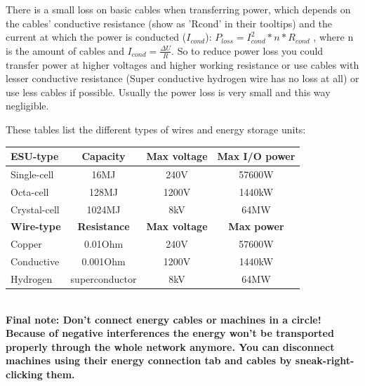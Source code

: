 \documentclass[11pt]{article} %
\begin{document}
There is a small loss on basic cables when transferring power, which depends on the cables' conductive resistance (show as 'Rcond' in their tooltips) and the current at which the power is conducted ($I_{cond}$): ${P_{loss} = I_{cond}^2 * n * R_{cond}}$ , where n is the amount of cables and ${I_{cond} = \frac{\Delta U}{R}}$. So to reduce power loss you could transfer power at higher voltages and higher working resistance or use cables with lesser conductive resistance (Super conductive hydrogen wire has no loss at all) or use less cables if possible. Usually the power loss is very small and this way negligible.

These tables list the different types of wires and energy storage units: \\
\begin{tabular}{| l | c | c | c |} \hline
\bf ESU-type & \bf Capacity & \bf Max voltage & \bf Max I/O power \\ \hline
Single-cell & 16MJ & 240V & 57600W \\
Octa-cell & 128MJ & 1200V & 1440kW \\
Crystal-cell & 1024MJ & 8kV & 64MW \\ \hline
\bf Wire-type & \bf Resistance & \bf Max voltage & \bf Max power \\ \hline
Copper & 0.01Ohm & 240V & 57600W \\
Conductive & 0.001Ohm & 1200V & 1440kW \\
Hydrogen & superconductor & 8kV & 64MW \\ \hline
\end{tabular}\\

\bf Final note: Don't connect energy cables or machines in a circle! Because of negative interferences the energy won't be transported properly through the whole network anymore. \rm You can disconnect machines using their energy connection tab and cables by sneak-right-clicking them.
\end{document}
